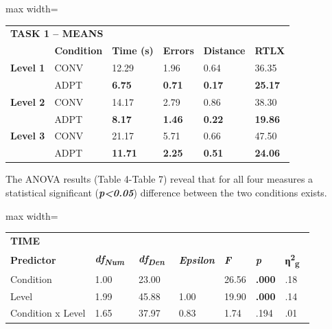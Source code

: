 \documentclass[sigconf]{nimeart}
\begin{document}
\begin{table}[htbp]\centering\small
\begin{adjustbox}{max width=\textwidth}\begin{tabular}{llllll}
\toprule
\midrule
\multicolumn{6}{l}{%
\textbf{TASK 1 -- MEANS}} \\
 & \textbf{Condition} & \textbf{Time (s)} & \textbf{Errors} & \textbf{Distance} & \textbf{RTLX} \\
\textbf{Level 1} & CONV & 12.29 & 1.96 & 0.64 & 36.35 \\
 & ADPT & \textbf{6.75} & \textbf{0.71} & \textbf{0.17} & \textbf{25.17} \\
\textbf{Level 2} & CONV & 14.17 & 2.79 & 0.86 & 38.30 \\
 & ADPT & \textbf{8.17} & \textbf{1.46} & \textbf{0.22} & \textbf{19.86} \\
\textbf{Level 3} & CONV & 21.17 & 5.71 & 0.66 & 47.50 \\
 & ADPT & \textbf{11.71} & \textbf{2.25} & \textbf{0.51} & \textbf{24.06} \\
\bottomrule
\end{tabular}\end{adjustbox}\end{table}

The ANOVA results (Table 4-Table 7) reveal that for all four measures a statistical significant (\textbf{\emph{p\textless0.05}}) difference between the two conditions exists.

\begin{table}[htbp]\centering\small
\begin{adjustbox}{max width=\textwidth}\begin{tabular}{lllllll}
\toprule
\midrule
\multicolumn{7}{l}{%
\textbf{TIME}} \\
\textbf{Predictor} & \textbf{\emph{df}}\textsubscript{\textbf{\emph{Num~}}} & \textbf{\emph{df}}\textsubscript{\textbf{\emph{Den~}}} & \textbf{\emph{Epsilon}} & \textbf{\emph{F}} & \textbf{\emph{p}} & \textbf{η}\textsuperscript{\textbf{2}}\textsubscript{\textbf{g~}} \\
Condition & 1.00 & 23.00 & 
 & 26.56 & \textbf{.000} & .18 \\
Level & 1.99 & 45.88 & 1.00 & 19.90 & \textbf{.000} & .14 \\
Condition x Level & 1.65 & 37.97 & 0.83 & 1.74 & .194 & .01 \\
\bottomrule
\end{tabular}\end{adjustbox}\end{table}
\end{document}
